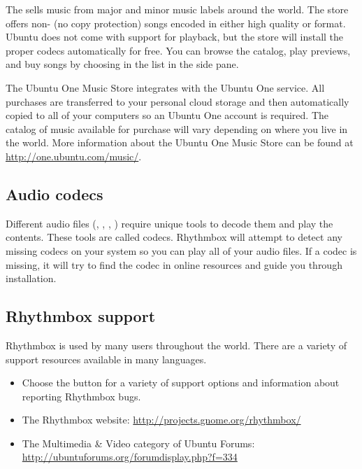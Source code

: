 The  sells music from major and minor music labels around the world. The store offers non- (no copy protection) songs encoded in either high quality  or  format. Ubuntu does not come with support for  playback, but the store will install the proper codecs automatically for free. You can browse the catalog, play previews, and buy songs by choosing  in the  list in the side pane.

The Ubuntu One Music Store integrates with the Ubuntu One service. All purchases
are transferred to your personal cloud storage and then automatically copied to
all of your computers so an Ubuntu One account is required. The catalog of music
available for purchase will vary depending on where you live in the world. More
information about the Ubuntu One Music Store can be found at
\url{http://one.ubuntu.com/music/}.

\subsection{Audio codecs}
Different audio files (\eg, , , ) require unique tools to decode them and play the contents. These tools are called codecs. Rhythmbox will attempt to detect any missing codecs on your system so you can play all of your audio files. If a codec is missing, it will try to find the codec in online resources and guide you through installation.

\subsection{Rhythmbox support}
Rhythmbox is used by many users throughout the world. There are a variety of support resources available in many languages.

\begin{itemize}
  \item Choose the  button for a variety of support options and information about reporting Rhythmbox bugs.
  \item The Rhythmbox website: \url{http://projects.gnome.org/rhythmbox/}
  \item The Multimedia \& Video category of Ubuntu Forums: \url{http://ubuntuforums.org/forumdisplay.php?f=334}
\end{itemize}
